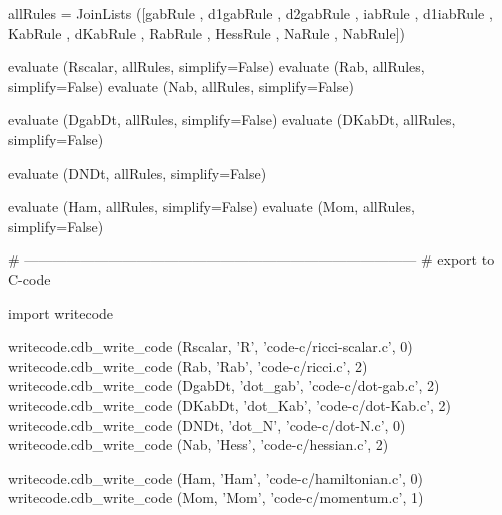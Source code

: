 \documentclass[12pt]{cdblatex}
\begin{document}
\begin{cadabra}
   allRules = JoinLists ([gabRule , d1gabRule , d2gabRule ,
                          iabRule , d1iabRule ,
                          KabRule , dKabRule ,
                          RabRule ,
                          HessRule , NaRule , NabRule])

   evaluate (Rscalar, allRules, simplify=False)
   evaluate (Rab,     allRules, simplify=False)
   evaluate (Nab,     allRules, simplify=False)

   evaluate (DgabDt,  allRules, simplify=False)
   evaluate (DKabDt,  allRules, simplify=False)

   evaluate (DNDt,    allRules, simplify=False)

   evaluate (Ham,     allRules, simplify=False)
   evaluate (Mom,     allRules, simplify=False)

   # ------------------------------------------------------------------------------------
   # export to C-code

   import writecode

   writecode.cdb_write_code (Rscalar, 'R',       'code-c/ricci-scalar.c', 0)
   writecode.cdb_write_code (Rab,     'Rab',     'code-c/ricci.c',        2)
   writecode.cdb_write_code (DgabDt,  'dot_gab', 'code-c/dot-gab.c',      2)
   writecode.cdb_write_code (DKabDt,  'dot_Kab', 'code-c/dot-Kab.c',      2)
   writecode.cdb_write_code (DNDt,    'dot_N',   'code-c/dot-N.c',        0)
   writecode.cdb_write_code (Nab,     'Hess',    'code-c/hessian.c',      2)

   writecode.cdb_write_code (Ham,     'Ham',     'code-c/hamiltonian.c',  0)
   writecode.cdb_write_code (Mom,     'Mom',     'code-c/momentum.c',     1)
\end{cadabra}
\end{document}
